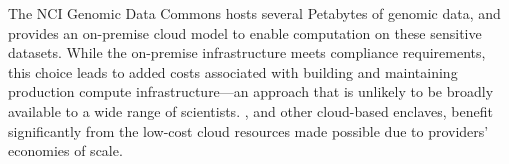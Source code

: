 The NCI Genomic Data Commons \cite{grossman2016toward} hosts several Petabytes of
genomic data, and provides an on-premise cloud model to enable computation on these sensitive datasets.
While the on-premise infrastructure meets compliance requirements, this choice leads to added costs associated with
building and maintaining production compute infrastructure---an approach that is unlikely to be 
broadly available to a wide range of scientists. \NAMENS, and other cloud-based enclaves, benefit
significantly from the low-cost cloud resources made possible due to providers' economies of scale.




